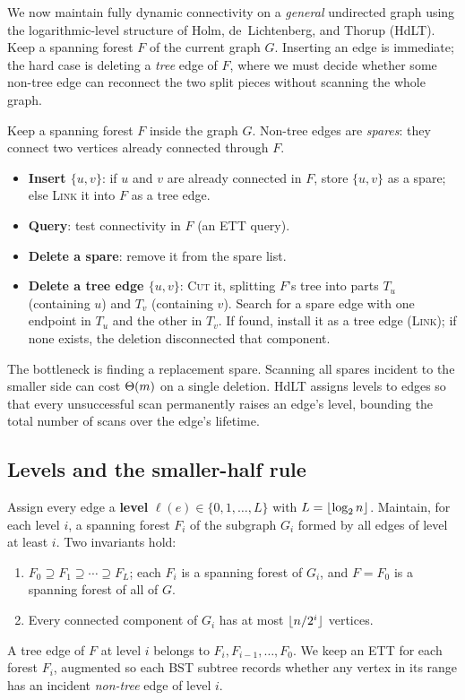 We now maintain fully dynamic connectivity on a \emph{general} undirected graph using
the logarithmic-level structure of Holm, de~Lichtenberg, and Thorup (HdLT). Keep a
spanning forest $F$ of the current graph $G$. Inserting an edge is immediate; the
hard case is deleting a \emph{tree} edge of $F$, where we must decide whether some
non-tree edge can reconnect the two split pieces without scanning the whole graph.

\begin{intuitionbox}
Keep a spanning forest $F$ inside the graph $G$. Non-tree edges are
\emph{spares}: they connect two vertices already connected through $F$.
\begin{itemize}
  \item \textbf{Insert $\{u,v\}$}: if $u$ and $v$ are already connected in $F$, store
        $\{u,v\}$ as a spare; else \textsc{Link} it into $F$ as a tree edge.
  \item \textbf{Query}: test connectivity in $F$ (an ETT query).
  \item \textbf{Delete a spare}: remove it from the spare list.
  \item \textbf{Delete a tree edge $\{u,v\}$}: \textsc{Cut} it, splitting $F$'s
        tree into parts $T_u$ (containing $u$) and $T_v$ (containing $v$). Search for
        a spare edge with one endpoint in $T_u$ and the other in $T_v$. If found,
        install it as a tree edge (\textsc{Link}); if none exists, the deletion
        disconnected that component.
\end{itemize}
The bottleneck is finding a replacement spare. Scanning all spares incident to the
smaller side can cost $\Theta(m)$ on a single deletion. HdLT assigns levels to edges so
that every unsuccessful scan permanently raises an edge's level, bounding the total
number of scans over the edge's lifetime.
\end{intuitionbox}

\subsection*{Levels and the smaller-half rule}

\begin{focusbox}
Assign every edge a \textbf{level} $\ell(e)\in\{0,1,\dots,L\}$ with
$L=\lfloor\log_2 n\rfloor$. Maintain, for each level $i$, a spanning forest $F_i$ of the
subgraph $G_i$ formed by all edges of level at least $i$. Two invariants hold:
\begin{enumerate}
  \item[(I1)] $F_0\supseteq F_1\supseteq\cdots\supseteq F_L$; each $F_i$ is a
        spanning forest of $G_i$, and $F = F_0$ is a spanning forest of all of $G$.
  \item[(I2)] Every connected component of $G_i$ has at most $\lfloor n/2^i\rfloor$ vertices.
\end{enumerate}
A tree edge of $F$ at level $i$ belongs to $F_i,F_{i-1},\dots,F_0$.
We keep an ETT for each forest $F_i$, augmented so each BST subtree records whether any
vertex in its range has an incident \emph{non-tree} edge of level $i$.
\end{focusbox}

